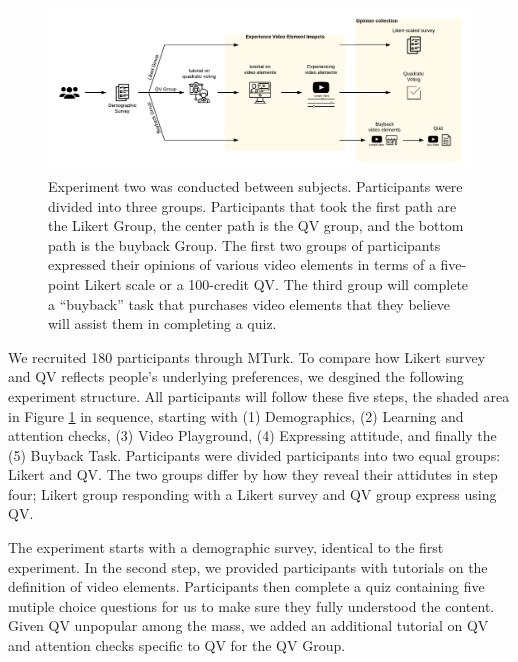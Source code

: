 \begin{figure}[htpb]
    \centering
    \includegraphics[width=\textwidth, keepaspectratio=true]{content/image/exp2_flow.pdf}
    \caption{
        Experiment two was conducted between subjects. Participants were divided into three groups. Participants that took the first path are the Likert Group, the center path is the QV group, and the bottom path is the buyback Group. The first two groups of participants expressed their opinions of various video elements in terms of a five-point Likert scale or a 100-credit QV. The third group will complete a ``buyback'' task that purchases video elements that they believe will assist them in completing a quiz.
    }
    \label{fig:exp2_flow}
\end{figure}

We recruited 180 participants through MTurk.
To compare how Likert survey and QV reflects people's underlying preferences,
we desgined the following experiment structure.
All participants will follow these five steps, the shaded area in Figure \ref{fig:exp2_flow} in sequence, starting with (1) Demographics, (2) Learning and attention checks, (3) Video Playground, (4) Expressing attitude, and finally the (5) Buyback Task.
Participants were divided participants into two equal groups: Likert and QV. 
The two groups differ by how they reveal their attidutes in step four;
Likert group responding with a Likert survey and QV group express using QV.

The experiment starts with a demographic survey, identical to the first experiment.
In the second step, we provided participants with tutorials on the definition of video elements. Participants then complete a quiz containing five mutiple choice questions for us to make sure they fully understood the content.
Given QV unpopular among the mass, we added an additional tutorial on QV and attention checks specific to QV for the QV Group.

